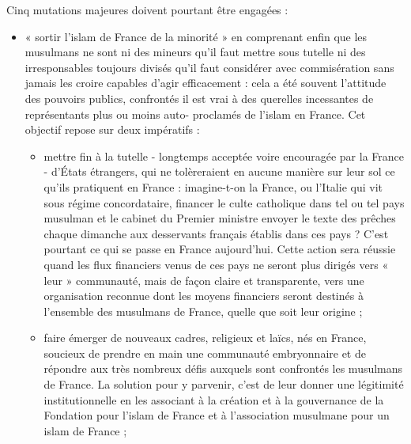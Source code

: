 Cinq mutations majeures doivent pourtant être engagées :


\begin{itemize}
\item
  « sortir l'islam de France de la minorité » en comprenant enfin que
  les musulmans ne sont ni des mineurs qu'il faut mettre sous tutelle ni
  des irresponsables toujours divisés qu'il faut considérer avec
  commisération sans jamais les croire capables d'agir efficacement :
  cela a été souvent l'attitude des pouvoirs publics, confrontés il est
  vrai à des querelles incessantes de représentants plus ou moins auto-
  proclamés de l'islam en France. Cet objectif repose sur deux
  impératifs :

  \begin{itemize}
  \item
    mettre fin à la tutelle - longtemps acceptée voire encouragée par la
    France - d'États étrangers, qui ne tolèreraient en aucune manière
    sur leur sol ce qu'ils pratiquent en France : imagine-t-on la
    France, ou l'Italie qui vit sous régime concordataire, financer le
    culte catholique dans tel ou tel pays musulman et le cabinet du
    Premier ministre envoyer le texte des prêches chaque dimanche aux
    desservants français établis dans ces pays ? C'est pourtant ce qui
    se passe en France aujourd'hui. Cette action sera réussie quand les
    flux financiers venus de ces pays ne seront plus dirigés vers « leur
    » communauté, mais de façon claire et transparente, vers une
    organisation reconnue dont les moyens financiers seront destinés à
    l'ensemble des musulmans de France, quelle que soit leur origine ;
  \item
    faire émerger de nouveaux cadres, religieux et laïcs, nés en France,
    soucieux de prendre en main une communauté embryonnaire et de
    répondre aux très nombreux défis auxquels sont confrontés les
    musulmans de France. La solution pour y parvenir, c'est de leur
    donner une légitimité institutionnelle en les associant à la
    création et à la gouvernance de la Fondation pour l'islam de France
    et à l'association musulmane pour un islam de France ;
  \end{itemize}


\end{itemize}
